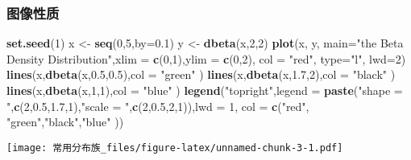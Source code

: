 \documentclass[]{article}
\newenvironment{Shaded}{\begin{snugshade}}{\end{snugshade}}
\newcommand{\DataTypeTok}[1]{\textcolor[rgb]{0.13,0.29,0.53}{#1}}
\newcommand{\DecValTok}[1]{\textcolor[rgb]{0.00,0.00,0.81}{#1}}
\newcommand{\FloatTok}[1]{\textcolor[rgb]{0.00,0.00,0.81}{#1}}
\newcommand{\KeywordTok}[1]{\textcolor[rgb]{0.13,0.29,0.53}{\textbf{#1}}}
\newcommand{\NormalTok}[1]{#1}
\newcommand{\StringTok}[1]{\textcolor[rgb]{0.31,0.60,0.02}{#1}}
\begin{document}
\hypertarget{section-1}{%
\subsubsection{图像性质}\label{section-1}}

\begin{Shaded}
\begin{Highlighting}[]
\KeywordTok{set.seed}\NormalTok{(}\DecValTok{1}\NormalTok{)}
\NormalTok{x <-}\StringTok{ }\KeywordTok{seq}\NormalTok{(}\DecValTok{0}\NormalTok{,}\DecValTok{5}\NormalTok{,}\DataTypeTok{by=}\FloatTok{0.1}\NormalTok{)}
\NormalTok{y <-}\StringTok{ }\KeywordTok{dbeta}\NormalTok{(x,}\DecValTok{2}\NormalTok{,}\DecValTok{2}\NormalTok{)}
\KeywordTok{plot}\NormalTok{(x, y, }\DataTypeTok{main=}\StringTok{"the Beta Density Distribution"}\NormalTok{,}\DataTypeTok{xlim =} \KeywordTok{c}\NormalTok{(}\DecValTok{0}\NormalTok{,}\DecValTok{1}\NormalTok{),}\DataTypeTok{ylim =} \KeywordTok{c}\NormalTok{(}\DecValTok{0}\NormalTok{,}\DecValTok{2}\NormalTok{), }\DataTypeTok{col =} \StringTok{"red"}\NormalTok{, }\DataTypeTok{type=}\StringTok{"l"}\NormalTok{, }\DataTypeTok{lwd=}\DecValTok{2}\NormalTok{)}
\KeywordTok{lines}\NormalTok{(x,}\KeywordTok{dbeta}\NormalTok{(x,}\FloatTok{0.5}\NormalTok{,}\FloatTok{0.5}\NormalTok{),}\DataTypeTok{col =} \StringTok{"green"}\NormalTok{ )}
\KeywordTok{lines}\NormalTok{(x,}\KeywordTok{dbeta}\NormalTok{(x,}\FloatTok{1.7}\NormalTok{,}\DecValTok{2}\NormalTok{),}\DataTypeTok{col =} \StringTok{"black"}\NormalTok{ )}
\KeywordTok{lines}\NormalTok{(x,}\KeywordTok{dbeta}\NormalTok{(x,}\DecValTok{1}\NormalTok{,}\DecValTok{1}\NormalTok{),}\DataTypeTok{col =} \StringTok{"blue"}\NormalTok{ )}
\KeywordTok{legend}\NormalTok{(}\StringTok{"topright"}\NormalTok{,}\DataTypeTok{legend =} \KeywordTok{paste}\NormalTok{(}\StringTok{"shape = "}\NormalTok{,}\KeywordTok{c}\NormalTok{(}\DecValTok{2}\NormalTok{,}\FloatTok{0.5}\NormalTok{,}\FloatTok{1.7}\NormalTok{,}\DecValTok{1}\NormalTok{),}\StringTok{"scale = "}\NormalTok{,}\KeywordTok{c}\NormalTok{(}\DecValTok{2}\NormalTok{,}\FloatTok{0.5}\NormalTok{,}\DecValTok{2}\NormalTok{,}\DecValTok{1}\NormalTok{)),}\DataTypeTok{lwd =} \DecValTok{1}\NormalTok{, }\DataTypeTok{col =} \KeywordTok{c}\NormalTok{(}\StringTok{"red"}\NormalTok{, }\StringTok{"green"}\NormalTok{,}\StringTok{"black"}\NormalTok{,}\StringTok{"blue"}\NormalTok{ ))}
\end{Highlighting}
\end{Shaded}

\texttt{[image: 常用分布族\_files/figure-latex/unnamed-chunk-3-1.pdf]}
\end{document}

